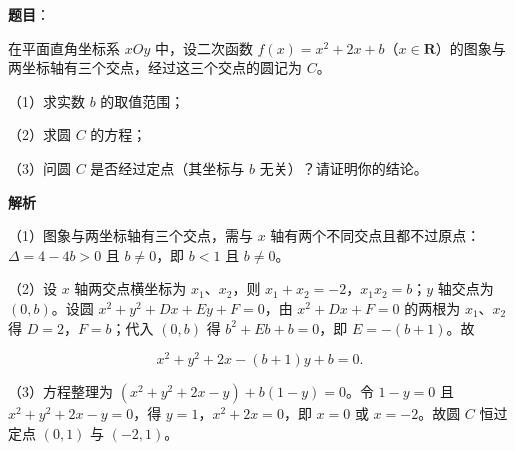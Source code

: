 \begin{answer}

\textbf{题目}：

在平面直角坐标系 $xOy$ 中，设二次函数 $f(x)=x^2+2x+b$（$x\in\mathbf R$）的图象与两坐标轴有三个交点，经过这三个交点的圆记为 $C$。

（1）求实数 $b$ 的取值范围；

（2）求圆 $C$ 的方程；

（3）问圆 $C$ 是否经过定点（其坐标与 $b$ 无关）？请证明你的结论。

\textbf{解析}

（1）图象与两坐标轴有三个交点，需与 $x$ 轴有两个不同交点且都不过原点：$\Delta=4-4b>0$ 且 $b\neq0$，即 $b<1$ 且 $b\neq0$。

（2）设 $x$ 轴两交点横坐标为 $x_1$、$x_2$，则 $x_1+x_2=-2$，$x_1x_2=b$；$y$ 轴交点为 $(0,b)$。设圆 $x^2+y^2+Dx+Ey+F=0$，由 $x^2+Dx+F=0$ 的两根为 $x_1$、$x_2$ 得 $D=2$，$F=b$；代入 $(0,b)$ 得 $b^2+Eb+b=0$，即 $E=-(b+1)$。故

\nopagebreak[4]
\[x^2+y^2+2x-(b+1)y+b=0.\]

（3）方程整理为 $(x^2+y^2+2x-y)+b(1-y)=0$。令 $1-y=0$ 且 $x^2+y^2+2x-y=0$，得 $y=1$，$x^2+2x=0$，即 $x=0$ 或 $x=-2$。故圆 $C$ 恒过定点 $(0,1)$ 与 $(-2,1)$。


\end{answer}
